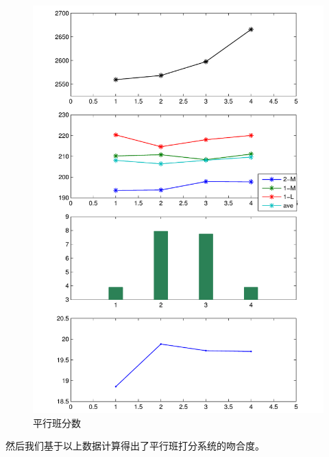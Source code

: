 \documentclass[a4paper]{article}
\begin{document}
  \begin{figure}[H]
  \centerline{\includegraphics[scale=0.5]{result.pdf}}
  \caption{平行班分数}
  \end{figure}

  然后我们基于以上数据计算得出了平行班打分系统的吻合度。
\end{document}
